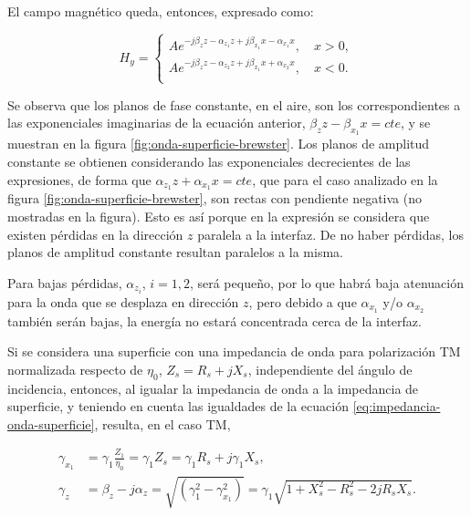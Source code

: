 El campo magnético queda, entonces, expresado como:

\begin{equation}
	H_y =
	\left\lbrace
	\begin{aligned}
		A e^{-j\beta_z z -\alpha_{z_1} z + j\beta_{x_1}x - \alpha_{x_1}x}, \quad x>0, \\
		A e^{-j\beta_z z -\alpha_{z_2} z + j\beta_{x_1}x + \alpha_{x_2}x}, \quad x<0. \\
	\end{aligned}
	\right.
\end{equation}

Se observa que los planos de fase constante, en el aire, son los correspondientes a las exponenciales imaginarias de la ecuación anterior, $\beta_z z - \beta_{x_1}x = cte$, y se muestran en la figura \ref{fig:onda-superficie-brewster}. Los planos de amplitud constante se obtienen considerando las exponenciales decrecientes de las expresiones, de forma que $\alpha_{z_1}z + \alpha_{x_1}x = cte$, que para el caso analizado en la figura \ref{fig:onda-superficie-brewster}, son rectas con pendiente negativa (no mostradas en la figura). Esto es así porque en la expresión se considera que existen pérdidas en la dirección $z$ paralela a la interfaz. De no haber pérdidas, los planos de amplitud constante resultan paralelos a la misma.

Para bajas pérdidas, $\alpha_{z_i}$, $i=1,2$, será pequeño, por lo que habrá baja atenuación para la onda que se desplaza en dirección $z$, pero debido a que $\alpha_{x_1}$ y/o $\alpha_{x_2}$ también serán bajas, la energía no estará concentrada cerca de la interfaz.



Si se considera una superficie con una impedancia de onda para polarización TM normalizada respecto de $\eta_0$, $Z_s = R_s + j X_s$, independiente del ángulo de incidencia, entonces, al igualar la impedancia de onda a la impedancia de superficie, y teniendo en cuenta las igualdades de la ecuación \ref{eq:impedancia-onda-superficie}, resulta, en el caso TM,

\begin{align}
	\gamma_{x_1} & = \gamma_1 \frac{Z_1}{\eta_0} = \gamma_1 Z_s = \gamma_1 R_s + j \gamma_1 X_s, \label{eq:h1-onda-superficie}\\
	\gamma_z &= \beta_z - j\alpha_z =\sqrt{(\gamma_1^2 - \gamma_{x_1}^2)} = \gamma_1 \sqrt{1+X_s^2 - R_s^2 - 2jR_s X_s}. \label{eq:beta-onda-superficie}
\end{align}

